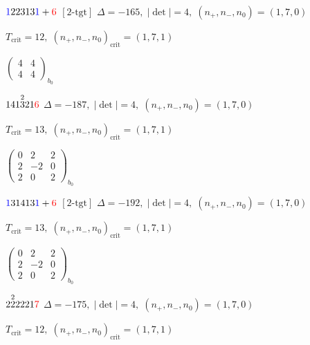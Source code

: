 \documentclass[10pt]{article}
\begin{document}
\smallskip

$\textcolor{blue}{1}22313\textcolor{blue}{1}+\textcolor{red}{6}$ $\scriptstyle [2\text{-tgt}]$ \quad $\Delta=-165,\; |\det|=4,\; (n_+,n_-,n_0)=(1,7,0)$

\hspace{1em}$T_{\text{crit}}=12,\; (n_+,n_-,n_0)_{\text{crit}}=(1,7,1)$

\hspace{2em}$\left(\begin{smallmatrix}4 & 4 \\ 4 & 4\end{smallmatrix}\right)_{\!b_0}$

\smallskip

$141\overset{2}{3}21\textcolor{red}{6}$ \quad $\Delta=-187,\; |\det|=4,\; (n_+,n_-,n_0)=(1,7,0)$

\hspace{1em}$T_{\text{crit}}=13,\; (n_+,n_-,n_0)_{\text{crit}}=(1,7,1)$

\hspace{2em}$\left(\begin{smallmatrix}0 & 2 & 2 \\ 2 & -2 & 0 \\ 2 & 0 & 2\end{smallmatrix}\right)_{\!b_0}$

\smallskip

$\textcolor{blue}{1}31413\textcolor{blue}{1}+\textcolor{red}{6}$ $\scriptstyle [2\text{-tgt}]$ \quad $\Delta=-192,\; |\det|=4,\; (n_+,n_-,n_0)=(1,7,0)$

\hspace{1em}$T_{\text{crit}}=13,\; (n_+,n_-,n_0)_{\text{crit}}=(1,7,1)$

\hspace{2em}$\left(\begin{smallmatrix}0 & 2 & 2 \\ 2 & -2 & 0 \\ 2 & 0 & 2\end{smallmatrix}\right)_{\!b_0}$

\smallskip

$2\overset{2}{2}2221\textcolor{red}{7}$ \quad $\Delta=-175,\; |\det|=4,\; (n_+,n_-,n_0)=(1,7,0)$

\hspace{1em}$T_{\text{crit}}=12,\; (n_+,n_-,n_0)_{\text{crit}}=(1,7,1)$
\end{document}
